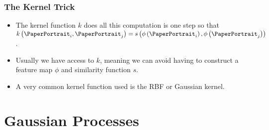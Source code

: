 \documentclass[9pt,hyperref={pdfpagelabels=false},xcolor=table]{beamer}
\begin{document}
\begin{frame}
    \frametitle{The Kernel Trick}
    \begin{itemize}
        \item The kernel function $k$ does all this computation is one step so that $k \left( \text{\PaperPortrait}_i , \text{\PaperPortrait}_j \right) = s \left( \phi \left( \text{\PaperPortrait}_i \right), \phi \left( \text{\PaperPortrait}_j \right) \right)$.
        \item Usually we have access to $k$, meaning we can avoid having to construct a feature map $\phi$ and similarity function $s$.
        \item A very common kernel function used is the RBF or Gaussian kernel.
    \end{itemize}
    \vspace*{-\baselineskip}
    \vspace*{-\baselineskip}
    \begin{figure}[h]
        \centering
    \end{figure}
\end{frame}

\section{Gaussian Processes}
\end{document}
